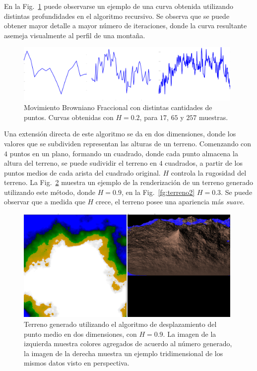 En la Fig.~\ref{fg:puntomedio} puede observarse un ejemplo de una curva obtenida utilizando distintas profundidades en el algoritmo recursivo.
Se observa que se puede obtener mayor detalle a mayor número de iteraciones, donde la curva resultante asemeja visualmente al perfil de una montaña.

\begin{figure}
\center
\includegraphics[width=11cm]{figures/puntomedio}
\caption[Movimiento Browniano Fraccional con distintas cantidades de puntos.]{Movimiento Browniano Fraccional con distintas cantidades de puntos. Curvas obtenidas con $H=0.2$, para $17$, $65$ y $257$ muestras.}
\label{fg:puntomedio}
\end{figure}


Una extensión directa de este algoritmo se da en dos dimensiones, donde los valores que se subdividen representan las alturas de un terreno.
Comenzando con $4$ puntos en un plano, formando un cuadrado, donde cada punto almacena la altura del terreno, se puede sudividir el terreno en $4$ cuadrados, a partir de los puntos medios de cada arista del cuadrado original.
$H$ controla la rugosidad del terreno.
La Fig.~\ref{fg:terreno} muestra un ejemplo de la renderización de un terreno generado utilizando este método, donde $H = 0.9$, en la Fig.~\ref{fg:terreno2} $H = 0.3$.
Se puede observar que a medida que $H$ crece, el terreno posee una apariencia más {\em suave}.

\begin{figure}
\center
\includegraphics[width=11cm]{figures/terreno}
\caption[Terreno generado utilizando el algoritmo de desplazamiento del punto medio en dos dimensiones, con $H = 0.9$]{Terreno generado utilizando el algoritmo de desplazamiento del punto medio en dos dimensiones, con $H = 0.9$. La imagen de la izquierda muestra colores agregados de acuerdo al número generado, la imagen de la derecha muestra un ejemplo tridimensional de los mismos datos visto en perspectiva.}
\label{fg:terreno}
\end{figure}

